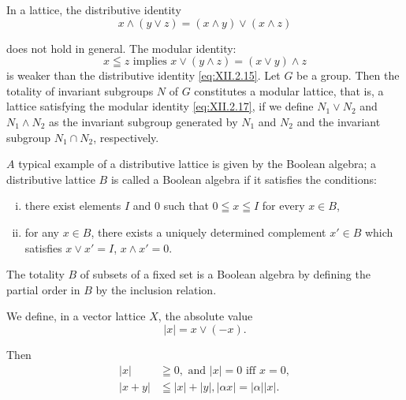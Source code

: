 \begin{remarkn}[Remark $1$] In a lattice, the distributive identity 
\begin{equation}\label{eq:XII.2.16}
x \wedge (y \vee z) = (x \wedge y) \vee (x \wedge z)
\end{equation}
\end{remarkn}

does not hold in general. The modular identity: 
\begin{equation}\label{eq:XII.2.17}
x \leqq z \text{ implies } x \vee (y \wedge z) = (x \vee y) \wedge z
\end{equation}
is weaker than the distributive identity \eqref{eq:XII.2.15}. Let $G$ be a group. Then the totality of invariant subgroups $N$ of $G$ constitutes a modular lattice, that is, a lattice satisfying the modular identity \eqref{eq:XII.2.17}, if we define $N_{1} \vee N_{2}$ and $N_{1} \wedge N_{2}$ as the invariant subgroup generated by $N_{1}$ and $N_{2}$ and the invariant subgroup $N_{1} \cap N_{2}$, respectively. 

\begin{remarkn}[Remark $2$] $A$ typical example of a distributive lattice is given by the Boolean algebra; a distributive lattice $B$ is called a Boolean algebra if it satisfies the conditions: \begin{enumerate}[(i)]
\item there exist elements $I$ and $0$ such that $0 \leqq x \leqq I$ for every $x \in B$,
\item for any $x \in B$, there exists a uniquely determined complement $x' \in B$ which satisfies $x \vee x' = I$, $x \wedge x' = 0$.
\end{enumerate}
 The totality $B$ of subsets of a fixed set is a Boolean algebra by defining the partial order in $B$ by the inclusion relation. 
\end{remarkn}

\begin{proposition}\label{prop:XII.2.Proposition.4} We define, in a vector lattice $X$, the absolute value 
\begin{equation}\label{eq:XII.2.18}
| x | = x \vee (- x).
\end{equation}
\end{proposition}

Then 
\begin{align}
| x |& \geqq 0, \text{ and } | x | = 0 \text{ iff } x = 0, \label{eq:XII.2.19} \\
| x + y |& \leqq | x | + | y |, | \alpha x | = | \alpha | | x |. \label{eq:XII.2.20}
\end{align}

